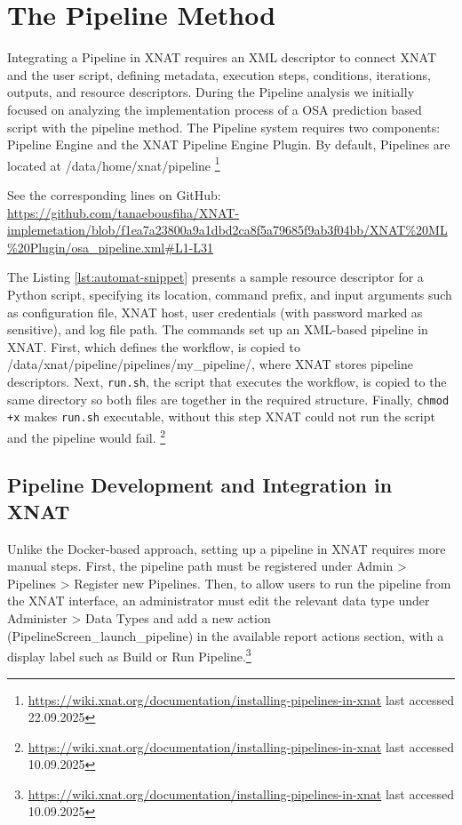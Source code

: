 
\section{The Pipeline Method}

Integrating a Pipeline in XNAT requires an \ac{XML} descriptor to connect XNAT and the user script, defining metadata, execution steps, conditions, iterations, outputs, and resource descriptors.
During the Pipeline analysis we initially focused on analyzing the implementation process of a OSA prediction based script with the pipeline method. The Pipeline system requires two components: Pipeline Engine and the XNAT Pipeline Engine Plugin. By default, Pipelines are located at /data/home/xnat/pipeline \footnote{\url{https://wiki.xnat.org/documentation/installing-pipelines-in-xnat} last accessed 22.09.2025}

\normalsize



\noindent\footnotesize See the corresponding lines on GitHub:\url{ https://github.com/tanaebousfiha/XNAT-implemetation/blob/f1ea7a23800a9a1dbd2ca8f5a79685f9ab3f04bb/XNAT%20ML%20Plugin/osa_pipeline.xml#L1-L31}
\normalsize

The  Listing \ref{lst:automat-snippet} presents a sample resource descriptor for a Python script, specifying its location, command prefix, and input arguments such as configuration file, XNAT host, user credentials (with password marked as sensitive), and log file path. 
The commands set up an XML-based pipeline in XNAT. First, which defines the workflow, is copied to /data/xnat/pipeline/pipelines/my\_pipeline/, where XNAT stores pipeline descriptors. Next, \texttt{run.sh}, the script that executes the workflow, is copied to the same directory so both files are together in the required structure. Finally, \texttt{chmod +x} makes \texttt{run.sh} executable, without this step XNAT could not run the script and the pipeline would fail.
\footnote{\url{https://wiki.xnat.org/documentation/installing-pipelines-in-xnat} last accessed 10.09.2025}
\normalsize
\subsection{Pipeline Development and Integration in XNAT}
Unlike the Docker-based approach, setting up a pipeline in XNAT requires more manual steps. First, the pipeline path must be registered under Admin > Pipelines > Register new Pipelines. Then, to allow users to run the pipeline from the XNAT interface, an administrator must edit the relevant data type under Administer > Data Types and add a new action (PipelineScreen\_launch\_pipeline) in the available report actions section, with a display label such as Build or Run Pipeline.\footnote{\url{https://wiki.xnat.org/documentation/installing-pipelines-in-xnat} last accessed 10.09.2025}
\normalsize

